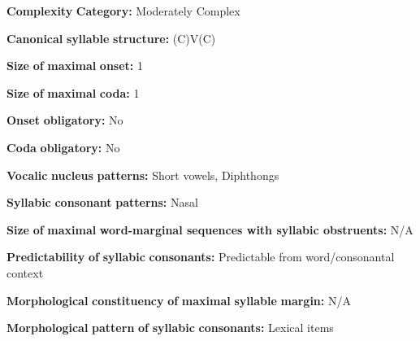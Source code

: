 \begin{styleBody}
\textbf{Complexity} \textbf{Category:} Moderately Complex
\end{styleBody}

\begin{styleBody}
\textbf{Canonical} \textbf{syllable} \textbf{structure:} (C)V(C) \citep[32-3]{Peterson2011}
\end{styleBody}

\begin{styleBody}
\textbf{Size} \textbf{of} \textbf{maximal} \textbf{onset:} 1
\end{styleBody}

\begin{styleBody}
\textbf{Size} \textbf{of} \textbf{maximal} \textbf{coda:} 1
\end{styleBody}

\begin{styleBody}
\textbf{Onset} \textbf{obligatory:} No
\end{styleBody}

\begin{styleBody}
\textbf{Coda} \textbf{obligatory:} No
\end{styleBody}

\begin{styleBody}
\textbf{Vocalic} \textbf{nucleus} \textbf{patterns:} Short vowels, Diphthongs
\end{styleBody}

\begin{styleBody}
\textbf{Syllabic} \textbf{consonant} \textbf{patterns:} Nasal
\end{styleBody}

\begin{styleBody}
\textbf{Size} \textbf{of} \textbf{maximal} \textbf{word{}-marginal sequences with syllabic obstruents:} N/A
\end{styleBody}

\begin{styleBody}
\textbf{Predictability} \textbf{of} \textbf{syllabic} \textbf{consonants:} Predictable from word/consonantal context
\end{styleBody}

\begin{styleBody}
\textbf{Morphological} \textbf{constituency} \textbf{of} \textbf{maximal} \textbf{syllable} \textbf{margin:} N/A
\end{styleBody}

\begin{styleBody}
\textbf{Morphological} \textbf{pattern} \textbf{of} \textbf{syllabic} \textbf{consonants:} Lexical items
\end{styleBody}

